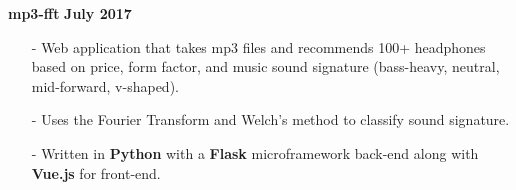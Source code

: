 \documentclass[margin,line]{res}
\begin{document}
\begin{resume}
\begin{itemize}
  \end{itemize}
{\bf mp3-fft} \hfill {\bf July 2017} \\
  \vspace{-3.5mm}
  \begin{itemize} \itemsep -2pt
    \item[-] Web application that takes mp3 files and recommends 100+ headphones based on price, form factor, and
      music sound signature (bass-heavy, neutral, mid-forward, v-shaped).
    \item[-] Uses the Fourier Transform and Welch's method to classify sound signature.
    \item[-] Written in {\bf Python} with a {\bf Flask} microframework back-end along with {\bf Vue.js} for front-end.
  \end{itemize}

\end{resume}
\end{document}
